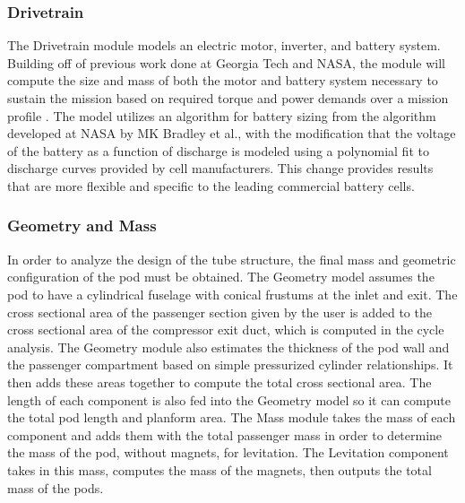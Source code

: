 \subsubsection{Drivetrain}
	The Drivetrain module models an electric motor, inverter, and battery system.
	Building off of previous work done at Georgia Tech and NASA, the module
	will compute the size and mass of both the motor and battery system
	necessary to sustain the mission based on required torque and power demands
	over a mission profile \cite{GeorgiaTechMotor, NASASugar}. The model
	utilizes an algorithm for battery sizing from the algorithm
	developed at NASA by MK Bradley et al.\cite{NASASugar}, with the modification that the
	voltage of the battery as a function of discharge is modeled using a
	polynomial fit to discharge curves provided by cell manufacturers.
	This change provides results that are more flexible and specific to the
	leading commercial battery cells.
\subsubsection{Geometry and Mass}
	In order to analyze the design of the tube structure, the final mass and
	geometric configuration of the pod must be obtained. The Geometry model
	assumes the pod to have a cylindrical fuselage with conical frustums at
	the inlet and exit. The cross sectional area of the passenger section
	given by the user is added to the cross sectional area of the compressor
	exit duct, which is computed in the cycle analysis. The Geometry module
	also estimates the thickness of the pod wall and the passenger compartment
	based on simple pressurized cylinder relationships. It then adds these areas
	together to compute the total cross sectional area. The length of each
	component is also fed into the Geometry model so it can compute the total
	pod length and planform area. The Mass module takes the mass of each
	component and adds them with the total passenger mass in order to determine
	the mass of the pod, without magnets, for levitation. The Levitation component
	takes in this mass, computes the mass of the magnets, then outputs the total mass of the pods.
